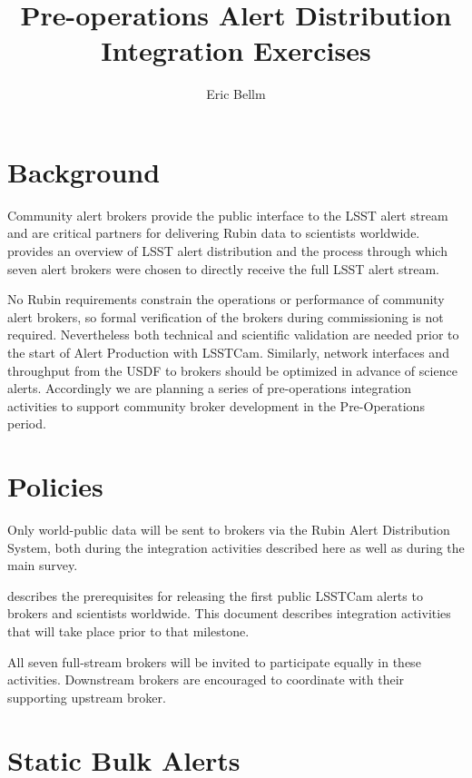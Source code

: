 \documentclass[DM,authoryear,toc]{lsstdoc}
\title{Pre-operations Alert Distribution Integration Exercises}
\author{%
Eric Bellm
}
\date{\vcsDate}
\begin{document}
\maketitle
\section{Background}

Community alert brokers provide the public interface to the LSST alert stream and are critical partners for delivering Rubin data to scientists worldwide.
 provides an overview of LSST alert distribution and the process through which seven alert brokers were chosen to directly receive the full LSST alert stream.

No Rubin requirements constrain the operations or performance of community alert brokers, so formal verification of the brokers during commissioning is not required.
Nevertheless both technical and scientific validation are needed prior to the start of Alert Production with LSSTCam.
Similarly, network interfaces and throughput from the USDF to brokers should be optimized in advance of science alerts.
Accordingly we are planning a series of pre-operations integration activities to support community broker development in the Pre-Operations period.

\section{Policies}

Only world-public data will be sent to brokers via the Rubin Alert Distribution System, both during the integration activities described here as well as during the main survey.

 describes the prerequisites for releasing the first public LSSTCam alerts to brokers and scientists worldwide.
This document describes integration activities that will take place prior to that milestone.

All seven full-stream brokers will be invited to participate equally in these activities.
Downstream brokers are encouraged to coordinate with their supporting upstream broker.

\section{Static Bulk Alerts}
\end{document}
